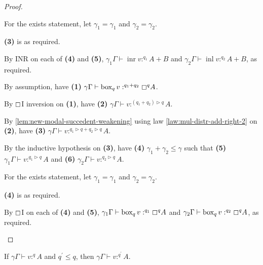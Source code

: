 \documentclass[acmsmall,screen,nonacm]{acmart}
\DeclareMathOperator{\bbox}{\text{box}}
\DeclareMathOperator{\inl}{\text{inl}}
\DeclareMathOperator{\inr}{\text{inr}}
\newcommand{\tee}{\vdash}
\DeclareMathOperator{\boxop}{\mathbin{\triangleright}}
\begin{document}
\begin{proof}
\begin{description}
    For the exists statement, let $\gamma_1 = \gamma_1$ and $\gamma_2 = \gamma_2$.

    \textbf{(3)} is as required.

    By INR on each of \textbf{(4)} and \textbf{(5)}, $\gamma_1\Gamma \tee \inr v :^{q_1} A + B$ and $\gamma_2\Gamma \tee \inl v :^{q_2} A + B$, as required.
    \\
    \item[Case $\boxempty$I.] 
    By assumption, have \textbf{(1)} $\gamma\Gamma \tee \bbox_q v :^{q_1 + q_2} \boxempty^q A$.

    By $\boxempty$I inversion on \textbf{(1)}, have \textbf{(2)} $\gamma\Gamma \tee v :^{(q_1 + q_2) \boxop q} A$.

    By \ref{lem:new-modal-succedent-weakening} using law \ref{law:mul-distr-add-right-2} on \textbf{(2)}, have \textbf{(3)} $\gamma\Gamma \tee v :^{q_1 \boxop q + q_2 \boxop q} A$.

    By the inductive hypothesis on \textbf{(3)}, have \textbf{(4)} $\gamma_1 + \gamma_2 \le \gamma$ such that \textbf{(5)} $\gamma_1\Gamma \tee v :^{q_1 \boxop q} A$ and \textbf{(6)} $\gamma_2\Gamma \tee v :^{q_2 \boxop q} A$.

    For the exists statement, let $\gamma_1 = \gamma_1$ and $\gamma_2 = \gamma_2$.

    \textbf{(4)} is as required.

    By $\boxempty$I on each of \textbf{(4)} and \textbf{(5)}, $\gamma_1\Gamma \tee \bbox_q v :^{q_1} \boxempty^q A$ and $\gamma_2\Gamma \tee \bbox_q v :^{q_2} \boxempty^q A$, as required.
  \end{description}
\end{proof}

\begin{lemma}
\label{lem:new-modal-succedent-weakening}
  If $\gamma\Gamma \tee v :^q A$ and $q^\prime \le q$, then $\gamma\Gamma \tee v :^{q^\prime} A$.
\end{lemma}
\end{document}
